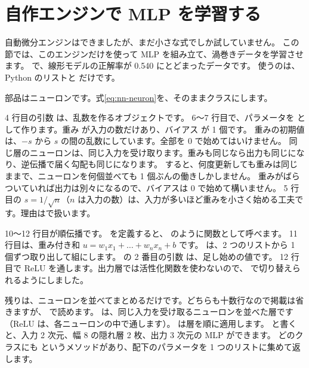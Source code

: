 \section{自作エンジンで MLP を学習する}\label{sec:nn-mlp-scratch}

自動微分エンジンはできましたが、まだ小さな式でしか試していません。
この節では、このエンジンだけを使って MLP を組み立て、渦巻きデータを学習させます。
で、線形モデルの正解率が 0.540 にとどまったデータです。
使うのは、Python のリストと  だけです。

部品はニューロンです。式\eqref{eq:nn-neuron}を、そのままクラスにします。


4 行目の引数  は、乱数を作るオブジェクトです。
6〜7 行目で、パラメータを  として作ります。重み  が入力の数だけあり、バイアス  が 1 個です。
重みの初期値は、$-s$ から $s$ の間の乱数にしています。全部を 0 で始めてはいけません。
同じ層のニューロンは、同じ入力を受け取ります。重みも同じなら出力も同じになり、逆伝播で届く勾配も同じになります。
すると、何度更新しても重みは同じままで、ニューロンを何個並べても 1 個ぶんの働きしかしません。
重みがばらついていれば出力は別々になるので、バイアスは 0 で始めて構いません。
5 行目の $s=1/\sqrt{n}$（$n$ は入力の数）は、入力が多いほど重みを小さく始める工夫です。理由はで扱います。

10〜12 行目が順伝播です。 を定義すると、 のように関数として呼べます。
11 行目は、重み付き和 $u=w_1x_1+\dots+w_nx_n+b$ です。 は、2 つのリストから 1 個ずつ取り出して組にします。
 の 2 番目の引数  は、足し始めの値です。
12 行目で ReLU を通します。出力層では活性化関数を使わないので、 で切り替えられるようにしました。

残りは、ニューロンを並べてまとめるだけです。どちらも十数行なので掲載は省きますが、 で読めます。
 は、同じ入力を受け取るニューロンを並べた層です（ReLU は、各ニューロンの中で通します）。 は層を順に適用します。
 と書くと、入力 2 次元、幅 8 の隠れ層 2 枚、出力 3 次元の MLP ができます。
どのクラスにも  というメソッドがあり、配下のパラメータを 1 つのリストに集めて返します。

